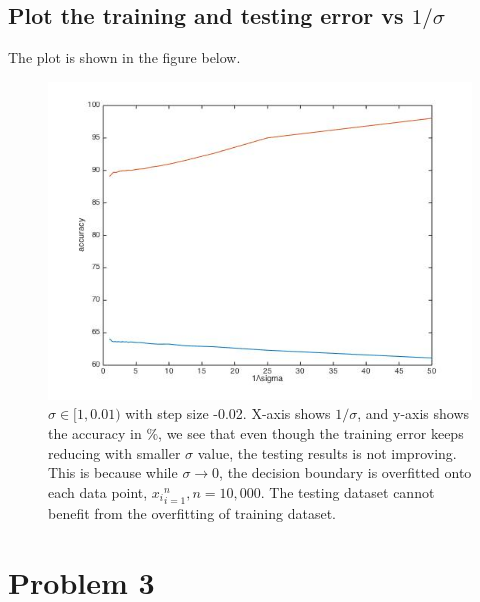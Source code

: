 \documentclass[twoside]{article}
\theoremstyle{definition}
\theoremstyle{definition}
\theoremstyle{remark}
\newcommand{\percent}{$\%$}
\begin{document}
\subsection{Plot the training and testing error vs $1/\sigma$}
The plot is shown in the figure below.
\begin{figure}[H]
\centering
\includegraphics[width=120mm]{training_testing_err.jpg}
\caption{ $\sigma \in [1,0.01)$ with step size -0.02. X-axis shows $1/\sigma$, and y-axis shows the accuracy in \percent, we see that even though the training error keeps reducing with smaller $\sigma$ value, the testing results is not improving. This is because while $\sigma \rightarrow 0$, the decision boundary is overfitted onto each data point, ${x_i}_{i=1}^n, n = 10,000$. The testing dataset cannot benefit from the overfitting of training dataset.} 
\end{figure}

\section{Problem 3}
\end{document}
